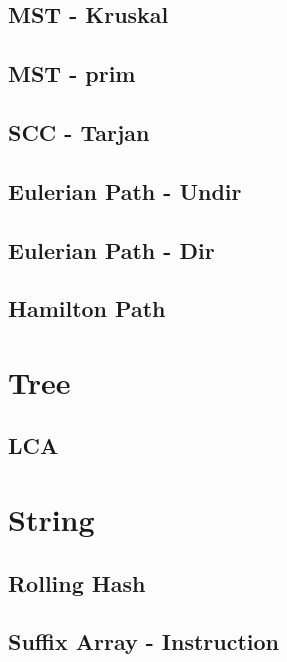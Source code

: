 \documentclass[twocolumn]{article}
\begin{document}
\subsection{MST - Kruskal}


\subsection{MST - prim}


\subsection{SCC - Tarjan}


\subsection{Eulerian Path - Undir}


\subsection{Eulerian Path - Dir}


\subsection{Hamilton Path}


\section{Tree}

\subsection{LCA}


\section{String}

\subsection{Rolling Hash}


\subsection{Suffix Array - Instruction}

\end{document}

